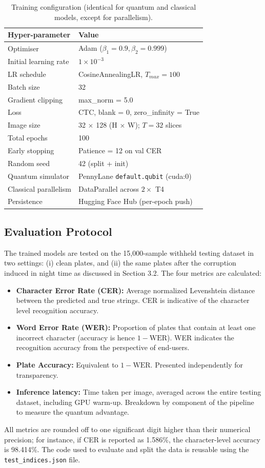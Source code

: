 \documentclass[preprint,12pt]{elsarticle}
\begin{document}
\begin{table}[h]
\centering
\caption{Training configuration (identical for quantum and classical models, except for parallelism).}
\label{tab:training}
\begin{tabularx}{\columnwidth}{@{}lX@{}}
\toprule
\textbf{Hyper-parameter} & \textbf{Value} \\
\midrule
Optimiser & Adam ($\beta_1=0.9, \beta_2=0.999$) \\
Initial learning rate & $1 \times 10^{-3}$ \\
LR schedule & CosineAnnealingLR, $T_{max} = 100$ \\
Batch size & 32 \\
Gradient clipping & max\_norm = 5.0 \\
Loss & CTC, blank = 0, zero\_infinity = True \\
Image size & 32 $\times$ 128 (H $\times$ W); $T = 32$ slices \\
Total epochs & 100 \\
Early stopping & Patience = 12 on val CER \\
Random seed & 42 (split + init) \\
Quantum simulator & PennyLane \texttt{default.qubit} (cuda:0) \\
Classical parallelism & DataParallel across $2\times$ T4 \\
Persistence & Hugging Face Hub (per-epoch push) \\
\bottomrule
\end{tabularx}
\end{table}

\subsection{Evaluation Protocol}
The trained models are tested on the 15,000-sample withheld testing dataset in two settings: (i) clean plates, and (ii) the same plates after the corruption induced in night time as discussed in Section 3.2. The four metrics are calculated:
\begin{itemize}
\item \textbf{Character Error Rate (CER):} Average normalized Levenshtein distance \cite{b36} between the predicted and true strings. CER is indicative of the character level recognition accuracy.
\item \textbf{Word Error Rate (WER):} Proportion of plates that contain at least one incorrect character (accuracy is hence $1 - \text{WER}$). WER indicates the recognition accuracy from the perspective of end-users.
\item \textbf{Plate Accuracy:} Equivalent to $1 - \text{WER}$. Presented independently for transparency.
\item \textbf{Inference latency:} Time taken per image, averaged across the entire testing dataset, including GPU warm-up. Breakdown by component of the pipeline to measure the quantum advantage.
\end{itemize}
All metrics are rounded off to one significant digit higher than their numerical precision; for instance, if CER is reported as 1.586\%, the character-level accuracy is 98.414\%. The code used to evaluate and split the data is reusable using the \texttt{test\_indices.json} file.
\end{document}
